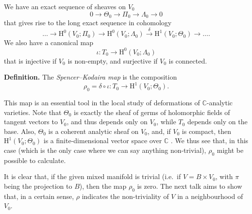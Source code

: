 \documentclass[british]{article}
\newenvironment{rmenv}[1]
  {\phantomsection\par\smallskip\noindent\textbf{#1.}\rmfamily}
  {\par\smallskip}
\newcommand{\oldpage}[1]{\marginpar{\footnotesize$\Big\vert$ \textit{p.~#1}}}
\begin{document}
We have an exact sequence of sheaves on \(V_0\) \[
  0 \to \Theta_0 \to \Pi_0 \to \Lambda_0 \to 0
\] that gives rise to the long exact sequence in cohomology \[
  \ldots \to \mathrm{H}^0(V_0;\Pi_0) \to \mathrm{H}^0(V_0;\Lambda_0) \xrightarrow{\delta} \mathrm{H}^1(V_0;\Theta_0) \to \ldots.
\] We also have a canonical map \oldpage{2-07} \[
  \iota\colon T_0 \to \mathrm{H}^0(V_0;\Lambda_0)
\] that is injective if \(V_0\) is non-empty, and surjective if \(V_0\)
is connected.

\protect{}\label{two-definition}
\begin{rmenv}{Definition}
The \emph{Spencer--Kodaira map} is the composition \[
  \rho_0 = \delta\circ\iota\colon T_0 \to \mathrm{H}^1(V_0;\Theta_0).
\]

\end{rmenv}

This map is an essential tool in the local study of deformations of
\(\mathbb{C}\)-analytic varieties. Note that \(\Theta_0\) is exactly the
sheaf of germs of holomorphic fields of tangent vectors to \(V_0\), and
thus depends only on \(V_0\), while \(T_0\) depends only on the base.
Also, \(\Theta_0\) is a coherent analytic sheaf on \(V_0\), and, if
\(V_0\) is compact, then \(\mathrm{H}^1(V_0;\Theta_0)\) is a
finite-dimensional vector space over \(\mathbb{C}\) \autocite{2-1}. We
thus see that, in this case (which is the only case where we can say
anything non-trivial), \(\rho_0\) might be possible to calculate.

It is clear that, if the given mixed manifold is trivial (i.e.~if
\(V=B\times V_0\), with \(\pi\) being the projection to \(B\)), then the
map \(\rho_0\) is zero. The next talk aims to show that, in a certain
sense, \(\rho\) indicates the non-triviality of \(V\) in a neighbourhood
of \(V_0\).


\nocite{*}
\printbibliography[heading=bibintoc,title=Bibliography]
\end{document}
